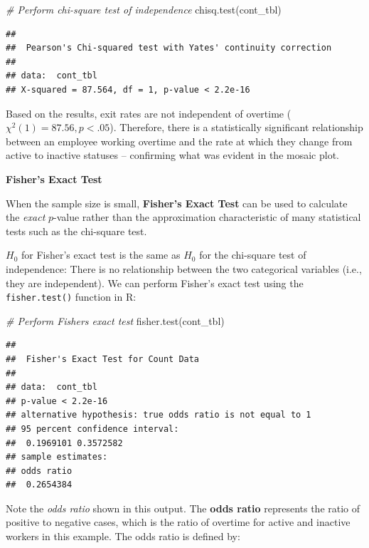 \documentclass[
]{book}
\newenvironment{Shaded}{\begin{snugshade}}{\end{snugshade}}
\newcommand{\CommentTok}[1]{\textcolor[rgb]{0.56,0.35,0.01}{\textit{#1}}}
\newcommand{\FunctionTok}[1]{\textcolor[rgb]{0.00,0.00,0.00}{#1}}
\newcommand{\NormalTok}[1]{#1}
\begin{document}
\begin{Shaded}
\begin{Highlighting}[]
\CommentTok{\# Perform chi{-}square test of independence}
\FunctionTok{chisq.test}\NormalTok{(cont\_tbl)}
\end{Highlighting}
\end{Shaded}

\begin{verbatim}
## 
##  Pearson's Chi-squared test with Yates' continuity correction
## 
## data:  cont_tbl
## X-squared = 87.564, df = 1, p-value < 2.2e-16
\end{verbatim}

Based on the results, exit rates are not independent of overtime (\({\chi}^2(1) = 87.56, p < .05\)). Therefore, there is a statistically significant relationship between an employee working overtime and the rate at which they change from active to inactive statuses -- confirming what was evident in the mosaic plot.

\textbf{Fisher's Exact Test}

When the sample size is small, \textbf{Fisher's Exact Test} can be used to calculate the \emph{exact} \(p\)-value rather than the approximation characteristic of many statistical tests such as the chi-square test.

\(H_0\) for Fisher's exact test is the same as \(H_0\) for the chi-square test of independence: There is no relationship between the two categorical variables (i.e., they are independent). We can perform Fisher's exact test using the \texttt{fisher.test()} function in R:

\begin{Shaded}
\begin{Highlighting}[]
\CommentTok{\# Perform Fisher\textquotesingle{}s exact test}
\FunctionTok{fisher.test}\NormalTok{(cont\_tbl)}
\end{Highlighting}
\end{Shaded}

\begin{verbatim}
## 
##  Fisher's Exact Test for Count Data
## 
## data:  cont_tbl
## p-value < 2.2e-16
## alternative hypothesis: true odds ratio is not equal to 1
## 95 percent confidence interval:
##  0.1969101 0.3572582
## sample estimates:
## odds ratio 
##  0.2654384
\end{verbatim}

Note the \emph{odds ratio} shown in this output. The \textbf{odds ratio} represents the ratio of positive to negative cases, which is the ratio of overtime for active and inactive workers in this example. The odds ratio is defined by:
\end{document}
